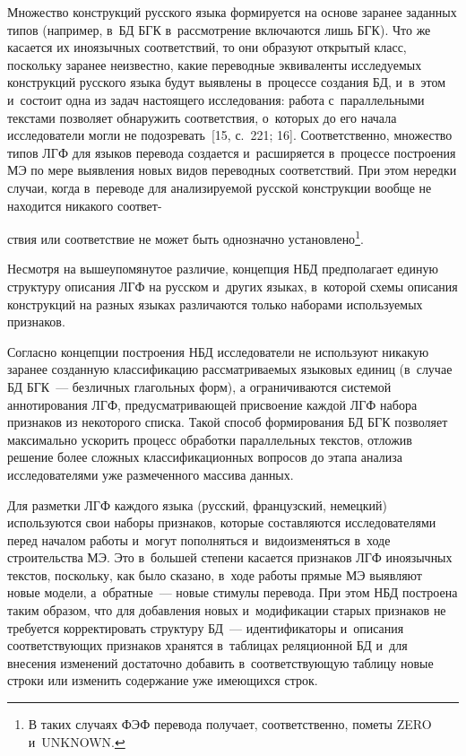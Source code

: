 \begin{multicols}{2}
Множество конструкций русского языка формируется на основе 
заранее заданных типов (например, в~БД БГК в~рассмотрение включаются лишь 
БГК). Что же касается их иноязычных 
соответствий, то они образуют открытый класс, поскольку заранее неизвестно, 
какие переводные эквиваленты ис\-сле\-ду\-емых конструкций русского языка 
будут выявлены в~процессе создания БД, и~в~этом и~состоит одна из 
задач настоящего исследования: работа с~параллельными текстами позволяет 
обнаружить соответствия, о~которых до его начала исследователи могли не 
подозревать~[15, с.~221; 16]. Соответственно, множество 
типов ЛГФ для языков перевода создается и~расширяется в~процессе 
построения МЭ по мере выявления новых видов переводных 
соответствий. При этом нередки случаи, когда в~переводе для анализируемой 
русской конструкции вообще не находится никакого соответ-\linebreak\vspace*{-12pt}

\pagebreak

\noindent
ствия или 
соответствие не может быть однозначно установлено\footnote[1]{В таких случаях 
ФЭФ перевода получает, соответственно, пометы ZERO и~UNKNOWN.}.
  
  Несмотря на вышеупомянутое различие, концепция НБД предполагает 
единую структуру описания ЛГФ на русском и~других языках, в~которой схемы 
описания конструкций на разных языках различаются только наборами 
используемых признаков. 
  
  Согласно концепции построения НБД исследователи не используют никакую 
заранее созданную классификацию рассматриваемых языковых единиц 
(в~случае БД БГК~--- безличных глагольных форм), а ограничиваются 
системой аннотирования ЛГФ, предусматривающей присвоение каждой ЛГФ 
набора признаков из некоторого списка. Такой способ формирования БД БГК 
позволяет максимально ускорить процесс обработки параллельных текстов, 
отложив решение более сложных классификационных вопросов до этапа 
анализа исследователями уже размеченного массива данных.
  
  Для разметки ЛГФ каждого языка (русский, французский, немецкий) 
используются свои наборы признаков, которые составляются исследователями 
перед началом работы и~могут пополняться и~видоизменяться в~ходе 
строительства МЭ. Это в~большей степени касается признаков ЛГФ 
иноязычных текстов, поскольку, как было сказано, в~ходе работы прямые МЭ 
выявляют новые модели, а~обратные~--- новые стимулы перевода. При этом 
НБД построена таким образом, что для добавления новых и~модификации 
старых признаков не требуется корректировать структуру БД~--- 
идентификаторы и~описания со\-от\-вет\-ст\-ву\-ющих признаков хранятся в~таблицах 
реляционной БД и~для внесения изменений достаточно добавить 
в~соответствующую таблицу новые строки или изменить содержание уже 
имеющихся строк.
  

\end{multicols}

